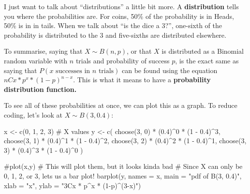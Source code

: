 \documentclass[
  letterpaper,
  DIV=11,
  numbers=noendperiod]{scrreprt}
\newenvironment{Shaded}{\begin{snugshade}}{\end{snugshade}}
\newcommand{\AttributeTok}[1]{\textcolor[rgb]{0.40,0.45,0.13}{#1}}
\newcommand{\CommentTok}[1]{\textcolor[rgb]{0.37,0.37,0.37}{#1}}
\newcommand{\DecValTok}[1]{\textcolor[rgb]{0.68,0.00,0.00}{#1}}
\newcommand{\FloatTok}[1]{\textcolor[rgb]{0.68,0.00,0.00}{#1}}
\newcommand{\FunctionTok}[1]{\textcolor[rgb]{0.28,0.35,0.67}{#1}}
\newcommand{\NormalTok}[1]{\textcolor[rgb]{0.00,0.23,0.31}{#1}}
\newcommand{\OtherTok}[1]{\textcolor[rgb]{0.00,0.23,0.31}{#1}}
\newcommand{\SpecialCharTok}[1]{\textcolor[rgb]{0.37,0.37,0.37}{#1}}
\newcommand{\StringTok}[1]{\textcolor[rgb]{0.13,0.47,0.30}{#1}}
\begin{document}
I just want to talk about ``distributions'' a little bit more. A
\textbf{distribution} tells you where the probabilities are. For coins,
50\% of the probability is in Heads, 50\% is in in tails. When we talk
about ``is the dice a 3?'', one-sixth of the probability is distributed
to the 3 and five-sixths are distributed elsewhere.

To summarise, saying that \(X \sim B(n,p)\), or that \(X\) is
distributed as a Binomial random variable with \(n\) trials and
probability of success \(p\), is the exact same as saying that
\(P(x\text{ successes in }n\text{ trials})\) can be found using the
equation \(nCx*p^x*(1-p)^{n-x}\). This is what it means to have a
\textbf{probability distribution function.}

To see all of these probabilities at once, we can plot this as a graph.
To reduce coding, let's look at \(X\sim B(3, 0.4)\):

\begin{Shaded}
\begin{Highlighting}[]
\NormalTok{x }\OtherTok{\textless{}{-}} \FunctionTok{c}\NormalTok{(}\DecValTok{0}\NormalTok{, }\DecValTok{1}\NormalTok{, }\DecValTok{2}\NormalTok{, }\DecValTok{3}\NormalTok{) }\CommentTok{\# X values}
\NormalTok{y }\OtherTok{\textless{}{-}} \FunctionTok{c}\NormalTok{(}
    \FunctionTok{choose}\NormalTok{(}\DecValTok{3}\NormalTok{, }\DecValTok{0}\NormalTok{) }\SpecialCharTok{*}\NormalTok{ (}\FloatTok{0.4}\NormalTok{)}\SpecialCharTok{\^{}}\DecValTok{0} \SpecialCharTok{*}\NormalTok{ (}\DecValTok{1} \SpecialCharTok{{-}} \FloatTok{0.4}\NormalTok{)}\SpecialCharTok{\^{}}\DecValTok{3}\NormalTok{,}
    \FunctionTok{choose}\NormalTok{(}\DecValTok{3}\NormalTok{, }\DecValTok{1}\NormalTok{) }\SpecialCharTok{*}\NormalTok{ (}\FloatTok{0.4}\NormalTok{)}\SpecialCharTok{\^{}}\DecValTok{1} \SpecialCharTok{*}\NormalTok{ (}\DecValTok{1} \SpecialCharTok{{-}} \FloatTok{0.4}\NormalTok{)}\SpecialCharTok{\^{}}\DecValTok{2}\NormalTok{,}
    \FunctionTok{choose}\NormalTok{(}\DecValTok{3}\NormalTok{, }\DecValTok{2}\NormalTok{) }\SpecialCharTok{*}\NormalTok{ (}\FloatTok{0.4}\NormalTok{)}\SpecialCharTok{\^{}}\DecValTok{2} \SpecialCharTok{*}\NormalTok{ (}\DecValTok{1} \SpecialCharTok{{-}} \FloatTok{0.4}\NormalTok{)}\SpecialCharTok{\^{}}\DecValTok{1}\NormalTok{,}
    \FunctionTok{choose}\NormalTok{(}\DecValTok{3}\NormalTok{, }\DecValTok{3}\NormalTok{) }\SpecialCharTok{*}\NormalTok{ (}\FloatTok{0.4}\NormalTok{)}\SpecialCharTok{\^{}}\DecValTok{3} \SpecialCharTok{*}\NormalTok{ (}\DecValTok{1} \SpecialCharTok{{-}} \FloatTok{0.4}\NormalTok{)}\SpecialCharTok{\^{}}\DecValTok{0}
\NormalTok{)}

\CommentTok{\#plot(x,y) \# This will plot them, but it looks kinda bad}
\CommentTok{\# Since X can only be 0, 1, 2, or 3, let\textquotesingle{}s us a bar plot!}
\FunctionTok{barplot}\NormalTok{(y, }\AttributeTok{names =}\NormalTok{ x,}
  \AttributeTok{main =} \StringTok{"pdf of B(3, 0.4)"}\NormalTok{, }\AttributeTok{xlab =} \StringTok{"x"}\NormalTok{,}
  \AttributeTok{ylab =} \StringTok{"3Cx * p\^{}x * (1{-}p)\^{}(3{-}x)"}\NormalTok{)}
\end{Highlighting}
\end{Shaded}
\end{document}
